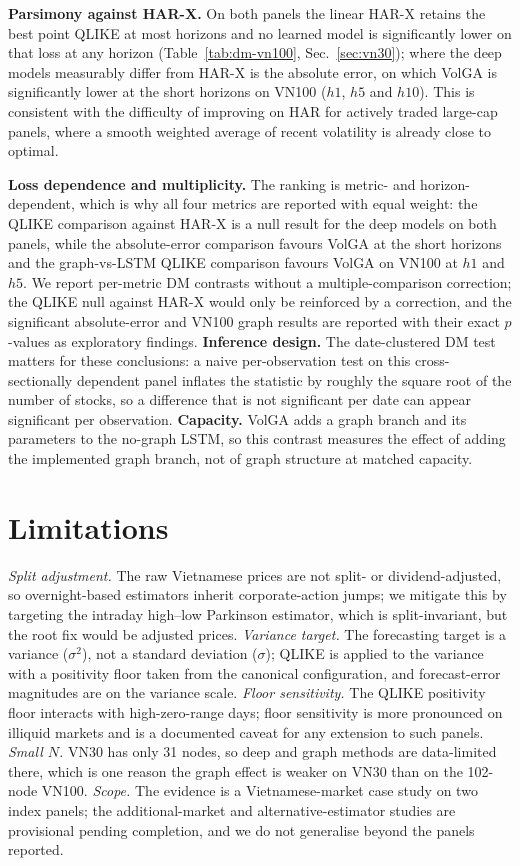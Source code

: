 \documentclass[runningheads]{llncs}
\begin{document}
\textbf{Parsimony against HAR-X.} On both panels the linear HAR-X retains the best point QLIKE at most
horizons and no learned model is significantly lower on that loss at any horizon
(Table~\ref{tab:dm-vn100}, Sec.~\ref{sec:vn30}); where the deep models measurably differ from HAR-X is
the absolute error, on which VolGA is significantly lower at the short horizons on VN100 ($h1$, $h5$
and $h10$). This is consistent with the difficulty of improving on HAR for actively traded large-cap
panels, where a smooth weighted average of recent volatility is already close to optimal.

\textbf{Loss dependence and multiplicity.} The ranking is metric- and horizon-dependent, which is why
all four metrics are reported with equal weight: the QLIKE comparison against HAR-X is a null result
for the deep models on both panels, while the absolute-error comparison favours VolGA at the short
horizons and the graph-vs-LSTM QLIKE comparison favours VolGA on VN100 at $h1$ and $h5$. We report
per-metric DM contrasts without a multiple-comparison correction; the QLIKE null against HAR-X would
only be reinforced by a correction, and the significant absolute-error and VN100 graph results are
reported with their exact $p$-values as exploratory findings. \textbf{Inference design.} The
date-clustered DM test matters for these conclusions: a naive per-observation test on this
cross-sectionally dependent panel inflates the statistic by roughly the square root of the number of
stocks, so a difference that is not significant per date can appear significant per observation.
\textbf{Capacity.} VolGA adds a graph branch and its parameters to the no-graph LSTM, so this contrast
measures the effect of adding the implemented graph branch, not of graph structure at matched capacity.

\section{Limitations}
\emph{Split adjustment.} The raw Vietnamese prices are not split- or dividend-adjusted, so
overnight-based estimators inherit corporate-action jumps; we mitigate this by targeting the intraday
high--low Parkinson estimator, which is split-invariant, but the root fix would be adjusted prices.
\emph{Variance target.} The forecasting target is a variance ($\sigma^2$), not a standard deviation
($\sigma$); QLIKE is applied to the variance with a positivity floor taken from the canonical
configuration, and forecast-error magnitudes are on the variance scale. \emph{Floor sensitivity.} The
QLIKE positivity floor interacts with high-zero-range days; floor sensitivity is more pronounced on
illiquid markets and is a documented caveat for any extension to such panels. \emph{Small $N$.} VN30
has only 31 nodes, so deep and graph methods are data-limited there, which is one reason the graph
effect is weaker on VN30 than on the 102-node VN100. \emph{Scope.} The evidence is a
Vietnamese-market case study on two index panels; the additional-market and alternative-estimator
studies are provisional pending completion, and we do not generalise beyond the panels reported.
\end{document}
